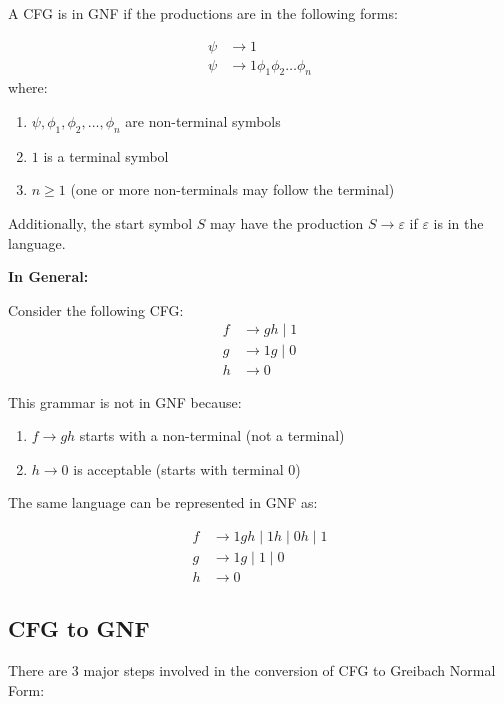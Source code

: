 \documentclass[12pt,a4paper,openany]{article}
\begin{document}
A CFG is in GNF if the productions are in the following forms:

\begin{align*}
\psi &\to 1 \\
\psi &\to 1\phi_1\phi_2 \ldots \phi_n
\end{align*}
where:
\begin{enumerate}
    \item $\psi, \phi_1, \phi_2, \ldots, \phi_n$ are non-terminal symbols
    \item $1$ is a terminal symbol
    \item $n \geq 1$ (one or more non-terminals may follow the terminal)
\end{enumerate}

Additionally, the start symbol $S$ may have the production $S \to \varepsilon$ if $\varepsilon$ is in the language.

\textbf{In General:}

Consider the following CFG:
\begin{align*}
f &\to gh \mid 1 \\
g &\to 1g \mid 0 \\
h &\to 0
\end{align*}

This grammar is not in GNF because:

\begin{enumerate}
    \item $f \to gh$ starts with a non-terminal (not a terminal)
    \item $h \to 0$ is acceptable (starts with terminal $0$)
\end{enumerate}

The same language can be represented in GNF as:

\begin{align*}
f &\to 1gh \mid 1h \mid 0h \mid 1 \\
g &\to 1g \mid 1 \mid 0 \\
h &\to 0
\end{align*}

\subsection{CFG to GNF}

There are 3 major steps involved in the conversion of CFG to Greibach Normal Form:
\end{document}
